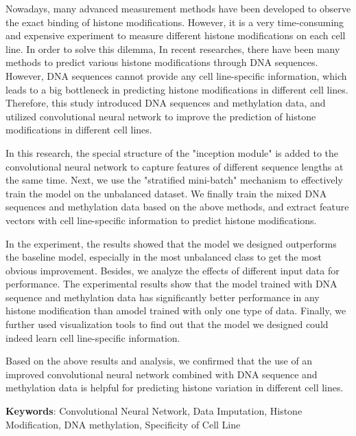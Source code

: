Nowadays, many advanced measurement methods have been developed to observe the exact binding of histone modifications. However, it is a very time-consuming and expensive experiment to measure different histone modifications on each cell line. In order to solve this dilemma, In recent researches, there have been many methods to predict various histone modifications through DNA sequences. However, DNA sequences cannot provide any cell line-specific information, which leads to a big bottleneck in predicting histone modifications in different cell lines. Therefore, this study introduced DNA sequences and methylation data, and utilized convolutional neural network to improve the prediction of histone modifications in different cell lines.

In this research, the special structure of the "inception module" is added to the convolutional neural network to capture features of different sequence lengths at the same time. Next, we use the "stratified mini-batch" mechanism to effectively train the model on the unbalanced dataset. We finally train the mixed DNA sequences and methylation data based on the above methods, and extract feature vectors with cell line-specific information to predict histone modifications.

In the experiment, the results showed that the model we designed outperforms the baseline model, especially in the most unbalanced class to get the most obvious improvement. Besides, we analyze the effects of different input data for performance. The experimental results show that the model trained with DNA sequence and methylation data has significantly better performance in any histone modification than amodel trained with only one type of data. Finally, we further used visualization tools to find out that the model we designed could indeed learn cell line-specific information.

Based on the above results and analysis, we confirmed that the use of an improved convolutional neural network combined with DNA sequence and methylation data is helpful for predicting histone variation in different cell lines.

\begin{flushleft}
{{\bf Keywords}: Convolutional Neural Network, Data Imputation, Histone Modification, DNA methylation, Specificity of Cell Line}
\end{flushleft}
